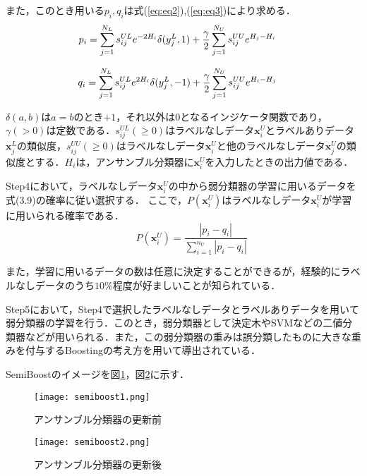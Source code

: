 また，このとき用いる$p_i, q_i$は式(\ref{eq:eq2}),(\ref{eq:eq3})により求める．
\begin{equation}
\label{eq:eq2}
 \hspace{-12pt} p_i =\sum_{j=1}^{N_L} s_{ij}^{UL} e^{-2H_i} \delta(y_j^L ,1) +\frac{\gamma}{2} \sum_{j=1}^{N_U} s_{ij}^{UU} e^{H_j-H_i}
\end{equation}\par
\begin{equation}
\label{eq:eq3}
 \hspace{-12pt} q_i =\sum_{j=1}^{N_L} s_{ij}^{UL} e^{2H_i} \delta(y_j^L ,-1) +\frac{\gamma}{2} \sum_{j=1}^{N_U} s_{ij}^{UU} e^{H_i-H_j}
\end{equation}\par
$\delta(a,b)$は$a = b$のとき$+1$，それ以外は$0$となるインジケータ関数であり，$\gamma  (> 0)$は定数である．$s_{ij}^{UL} (\geq 0)$はラベルなしデータ$\bm{x}_i^U$とラベルありデータ$\bm{x}_j^L$の類似度，$s_{ij}^{UU}(\geq 0)$はラベルなしデータ$\bm{x}_i^U$と他のラベルなしデータ$\bm{x}_j^U$の類似度とする．$H_i$は，アンサンブル分類器に$\bm{x}_i^U$を入力したときの出力値である．\par

Step4において，ラベルなしデータ$\bm{x}_i^U$の中から弱分類器の学習に用いるデータを式(3.9)の確率に従い選択する．
ここで，$P(\bm{x}_i^U)$はラベルなしデータ$\bm{x}_i^U$が学習に用いられる確率である．
\begin{equation}
\label{eq:eq7}
 \hspace{20pt} P(\bm{x}_i^U) = \frac{|p_i-q_i|}{\sum_{i=1}^{n_U}|p_i-q_i|}
\end{equation}\par
また，学習に用いるデータの数は任意に決定することができるが，経験的にラベルなしデータのうち$10\%$程度が好ましいことが知られている．

\vspace{1.0cm}

Step5において，Step4で選択したラベルなしデータとラベルありデータを用いて弱分類器の学習を行う．このとき，弱分類器として決定木やSVMなどの二値分類器などが用いられる．また，この弱分類器の重みは誤分類したものに大きな重みを付与するBoostingの考え方を用いて導出されている．


\vspace{1.0cm}
SemiBoostのイメージを図\ref{semi2}，図\ref{semi3}に示す．
\vspace{1.0cm}
\begin{figure}[H]
\centering
\texttt{[image: semiboost1.png]}
\caption{アンサンブル分類器の更新前}
\label{semi2}
\end{figure}
\vspace{1.0cm}
\begin{figure}[H]
\centering
\texttt{[image: semiboost2.png]}
\caption{アンサンブル分類器の更新後}
\label{semi3}
\end{figure}




